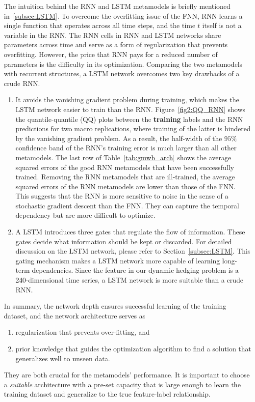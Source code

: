 The intuition behind the RNN and LSTM metamodels is briefly mentioned in~\ref{subsec:LSTM}.
To overcome the overfitting issue of the FNN, RNN learns a single function that operates across all time steps, and the time $t$ itself is not a variable in the RNN.
The RNN cells in RNN and LSTM networks share parameters across time and serve as a form of regularization that prevents overfitting.
However, the price that RNN pays for a reduced number of parameters is the difficulty in its optimization.
Comparing the two metamodels with recurrent structures, a LSTM network overcomes two key drawbacks of a crude RNN.
\begin{enumerate}
    \item It avoids the vanishing gradient problem during training, which makes the LSTM network easier to train than the RNN. Figure~\ref{fig2:QQ_RNN} shows the quantile-quantile (QQ) plots between the \textbf{training} labels and the RNN predictions for two macro replications, where training of the latter is hindered by the vanishing gradient problem. 
    As a result, the half-width of the $95\%$ confidence band of the RNN's training error is much larger than all other metamodels. 
    The last row of Table~\ref{tab:gmwb_arch} shows the average squared errors of the good RNN metamodels that have been successfully trained. 
    Removing the RNN metamodels that are ill-trained, the average squared errors of the RNN metamodels are lower than those of the FNN.
    This suggests that the RNN is more sensitive to noise in the sense of a stochastic gradient descent than the FNN.
    They can capture the temporal dependency but are more difficult to optimize.
    \item A LSTM introduces three gates that regulate the flow of information. 
    These gates decide what information should be kept or discarded.
    For detailed discussion on the LSTM network, please refer to Section~\ref{subsec:LSTM}.
    This gating mechanism makes a LSTM network more capable of learning long-term dependencies. 
    Since the feature in our dynamic hedging problem is a 240-dimensional time series, a LSTM network is more suitable than a crude RNN.
\end{enumerate}
In summary, the network depth ensures successful learning of the training dataset, and the network architecture serves as 
\begin{enumerate}
    \item regularization that prevents over-fitting, and 
    \item prior knowledge that guides the optimization algorithm to find a solution that generalizes well to unseen data.
\end{enumerate}
They are both crucial for the metamodels' performance.
It is important to choose a \textit{suitable} architecture with a pre-set capacity that is large enough to learn the training dataset and generalize to the true feature-label relationship.

